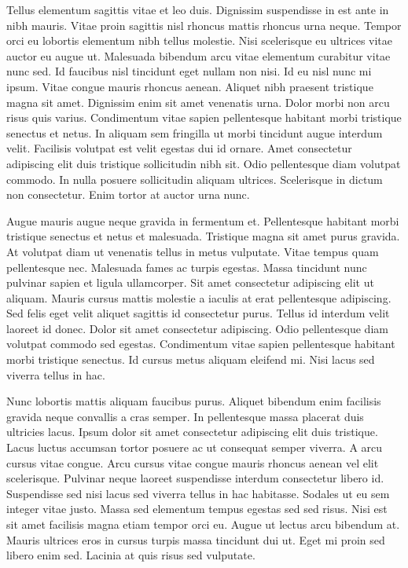 \documentclass[11pt,a4paper]{article}
\begin{document}
Tellus elementum sagittis vitae et leo duis. Dignissim suspendisse in est ante in nibh mauris. Vitae proin sagittis nisl rhoncus mattis rhoncus urna neque. Tempor orci eu lobortis elementum nibh tellus molestie. Nisi scelerisque eu ultrices vitae auctor eu augue ut. Malesuada bibendum arcu vitae elementum curabitur vitae nunc sed. Id faucibus nisl tincidunt eget nullam non nisi. Id eu nisl nunc mi ipsum. Vitae congue mauris rhoncus aenean. Aliquet nibh praesent tristique magna sit amet. Dignissim enim sit amet venenatis urna. Dolor morbi non arcu risus quis varius. Condimentum vitae sapien pellentesque habitant morbi tristique senectus et netus. In aliquam sem fringilla ut morbi tincidunt augue interdum velit. Facilisis volutpat est velit egestas dui id ornare. Amet consectetur adipiscing elit duis tristique sollicitudin nibh sit. Odio pellentesque diam volutpat commodo. In nulla posuere sollicitudin aliquam ultrices. Scelerisque in dictum non consectetur. Enim tortor at auctor urna nunc.

Augue mauris augue neque gravida in fermentum et. Pellentesque habitant morbi tristique senectus et netus et malesuada. Tristique magna sit amet purus gravida. At volutpat diam ut venenatis tellus in metus vulputate. Vitae tempus quam pellentesque nec. Malesuada fames ac turpis egestas. Massa tincidunt nunc pulvinar sapien et ligula ullamcorper. Sit amet consectetur adipiscing elit ut aliquam. Mauris cursus mattis molestie a iaculis at erat pellentesque adipiscing. Sed felis eget velit aliquet sagittis id consectetur purus. Tellus id interdum velit laoreet id donec. Dolor sit amet consectetur adipiscing. Odio pellentesque diam volutpat commodo sed egestas. Condimentum vitae sapien pellentesque habitant morbi tristique senectus. Id cursus metus aliquam eleifend mi. Nisi lacus sed viverra tellus in hac.

Nunc lobortis mattis aliquam faucibus purus. Aliquet bibendum enim facilisis gravida neque convallis a cras semper. In pellentesque massa placerat duis ultricies lacus. Ipsum dolor sit amet consectetur adipiscing elit duis tristique. Lacus luctus accumsan tortor posuere ac ut consequat semper viverra. A arcu cursus vitae congue. Arcu cursus vitae congue mauris rhoncus aenean vel elit scelerisque. Pulvinar neque laoreet suspendisse interdum consectetur libero id. Suspendisse sed nisi lacus sed viverra tellus in hac habitasse. Sodales ut eu sem integer vitae justo. Massa sed elementum tempus egestas sed sed risus. Nisi est sit amet facilisis magna etiam tempor orci eu. Augue ut lectus arcu bibendum at. Mauris ultrices eros in cursus turpis massa tincidunt dui ut. Eget mi proin sed libero enim sed. Lacinia at quis risus sed vulputate.
\end{document}
